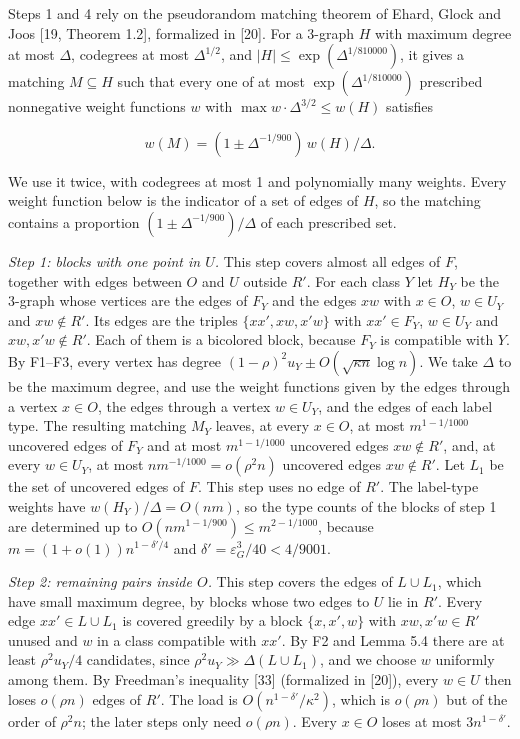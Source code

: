 \documentclass[english,11pt,a4paper]{article}
\begin{document}
Steps 1 and 4 rely on the pseudorandom matching theorem of Ehard, Glock and Joos {[}19, Theorem 1.2{]}, formalized in {[}20{]}. For a 3-graph \(H\) with maximum degree at most \(\Delta\), codegrees at most \(\Delta^{1/2}\), and \(|H|\le\exp(\Delta^{1/810000})\), it gives a matching \(M\subseteq H\) such that every one of at most \(\exp(\Delta^{1/810000})\) prescribed nonnegative weight functions \(w\) with \(\max w\cdot\Delta^{3/2}\le w(H)\) satisfies

\nopagebreak[4]
\[w(M)=(1\pm\Delta^{-1/900})\,w(H)/\Delta.\]

We use it twice, with codegrees at most 1 and polynomially many weights. Every weight function below is the indicator of a set of edges of \(H\), so the matching contains a proportion \((1\pm\Delta^{-1/900})/\Delta\) of each prescribed set.

\emph{Step 1: blocks with one point in \(U\).} This step covers almost all edges of \(F\), together with edges between \(O\) and \(U\) outside \(R'\). For each class \(Y\) let \(H_Y\) be the 3-graph whose vertices are the edges of \(F_Y\) and the edges \(xw\) with \(x\in O\), \(w\in U_Y\) and \(xw\notin R'\). Its edges are the triples \(\{xx',xw,x'w\}\) with \(xx'\in F_Y\), \(w\in U_Y\) and \(xw,x'w\notin R'\). Each of them is a bicolored block, because \(F_Y\) is compatible with \(Y\). By F1--F3, every vertex has degree \((1-\rho)^2u_Y\pm O(\sqrt{\kappa n}\log n)\). We take \(\Delta\) to be the maximum degree, and use the weight functions given by the edges through a vertex \(x\in O\), the edges through a vertex \(w\in U_Y\), and the edges of each label type. The resulting matching \(M_Y\) leaves, at every \(x\in O\), at most \(m^{1-1/1000}\) uncovered edges of \(F_Y\) and at most \(m^{1-1/1000}\) uncovered edges \(xw\notin R'\), and, at every \(w\in U_Y\), at most \(nm^{-1/1000}=o(\rho^2n)\) uncovered edges \(xw\notin R'\). Let \(L_1\) be the set of uncovered edges of \(F\). This step uses no edge of \(R'\). The label-type weights have \(w(H_Y)/\Delta=O(nm)\), so the type counts of the blocks of step 1 are determined up to \(O(nm^{1-1/900})\le m^{2-1/1000}\), because \(m=(1+o(1))n^{1-\delta'/4}\) and \(\delta'=\varepsilon_G^3/40<4/9001\).

\emph{Step 2: remaining pairs inside \(O\).} This step covers the edges of \(L\cup L_1\), which have small maximum degree, by blocks whose two edges to \(U\) lie in \(R'\). Every edge \(xx'\in L\cup L_1\) is covered greedily by a block \(\{x,x',w\}\) with \(xw,x'w\in R'\) unused and \(w\) in a class compatible with \(xx'\). By F2 and Lemma 5.4 there are at least \(\rho^2u_Y/4\) candidates, since \(\rho^2u_Y\gg\Delta(L\cup L_1)\), and we choose \(w\) uniformly among them. By Freedman's inequality {[}33{]} (formalized in {[}20{]}), every \(w\in U\) then loses \(o(\rho n)\) edges of \(R'\). The load is \(O(n^{1-\delta'}/\kappa^2)\), which is \(o(\rho n)\) but of the order of \(\rho^2n\); the later steps only need \(o(\rho n)\). Every \(x\in O\) loses at most \(3n^{1-\delta'}\).
\end{document}
